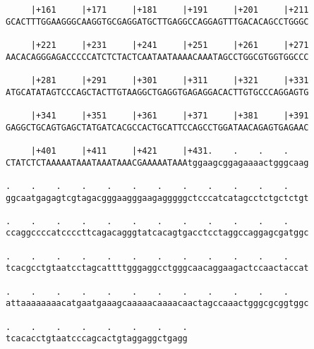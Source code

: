 \documentclass{article}
\begin{document}
\begin{Verbatim}
     |+161     |+171     |+181     |+191     |+201     |+211
GCACTTTGGAAGGGCAAGGTGCGAGGATGCTTGAGGCCAGGAGTTTGACACAGCCTGGGC
                                                            
     |+221     |+231     |+241     |+251     |+261     |+271
AACACAGGGAGACCCCCATCTCTACTCAATAATAAAACAAATAGCCTGGCGTGGTGGCCC
                                                            
     |+281     |+291     |+301     |+311     |+321     |+331
ATGCATATAGTCCCAGCTACTTGTAAGGCTGAGGTGAGAGGACACTTGTGCCCAGGAGTG
                                                            
     |+341     |+351     |+361     |+371     |+381     |+391
GAGGCTGCAGTGAGCTATGATCACGCCACTGCATTCCAGCCTGGATAACAGAGTGAGAAC
                                                            
     |+401     |+411     |+421     |+431.    .    .    .    
CTATCTCTAAAAATAAATAAATAAACGAAAAATAAAtggaagcggagaaaactgggcaag
                                                            
.    .    .    .    .    .    .    .    .    .    .    .    
ggcaatgagagtcgtagacgggaagggaagagggggctcccatcatagcctctgctctgt
                                                            
.    .    .    .    .    .    .    .    .    .    .    .    
ccaggccccatccccttcagacagggtatcacagtgacctcctaggccaggagcgatggc
                                                            
.    .    .    .    .    .    .    .    .    .    .    .    
tcacgcctgtaatcctagcattttgggaggcctgggcaacaggaagactccaactaccat
                                                            
.    .    .    .    .    .    .    .    .    .    .    .    
attaaaaaaaacatgaatgaaagcaaaaacaaaacaactagccaaactgggcgcggtggc
                                                            
.    .    .    .    .    .    .    .
tcacacctgtaatcccagcactgtaggaggctgagg
                                    
                                    
\end{Verbatim}
\end{document}
